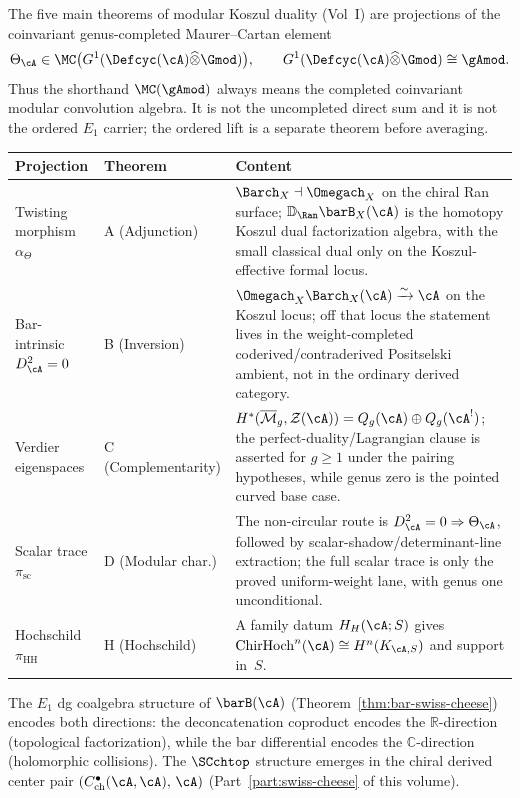 \begin{construction}
\label{constr:vol2-five-theorems-projections}
The five main theorems of modular Koszul duality (Vol~I) are
projections of the coinvariant genus-completed Maurer--Cartan
element
\[
\Theta_\cA \in
\MC\bigl(G^1(\Defcyc(\cA)\widehat{\otimes}\Gmod)\bigr),
\qquad
G^1(\Defcyc(\cA)\widehat{\otimes}\Gmod)\cong\gAmod .
\]
Thus the shorthand $\MC(\gAmod)$ always means the completed
coinvariant modular convolution algebra. It is not the uncompleted
direct sum and it is not the ordered $E_1$ carrier; the ordered lift
is a separate theorem before averaging.
\begin{center}
\begin{tabular}{@{}p{}p{}p{}@{}}
\toprule
Projection & Theorem & Content \\
\midrule
Twisting morphism $\alpha_\Theta$ & A (Adjunction) & $\Barch_X\dashv\Omegach_X$ on the chiral Ran surface; $\mathbb D_{\Ran}\barB_X(\cA)$ is the homotopy Koszul dual factorization algebra, with the small classical dual only on the Koszul-effective formal locus. \\
Bar-intrinsic $D_\cA^2 = 0$ & B (Inversion) & $\Omegach_X\Barch_X(\cA)\xrightarrow{\sim}\cA$ on the Koszul locus; off that locus the statement lives in the weight-completed coderived/contraderived Positselski ambient, not in the ordinary derived category. \\
Verdier eigenspaces & C (Complementarity) & $H^*(\overline{\mathcal M}_g,\mathcal Z(\cA))=Q_g(\cA)\oplus Q_g(\cA^!)$; the perfect-duality/Lagrangian clause is asserted for $g\ge1$ under the pairing hypotheses, while genus zero is the pointed curved base case. \\
Scalar trace $\pi_{\mathrm{sc}}$ & D (Modular char.) & The non-circular route is $D_\cA^2=0\Rightarrow\Theta_\cA$, followed by scalar-shadow/determinant-line extraction; the full scalar trace is only the proved uniform-weight lane, with genus one unconditional. \\
Hochschild $\pi_{\mathrm{HH}}$ & H (Hochschild) & A family datum $H_H(\cA;S)$ gives $\mathrm{ChirHoch}^n(\cA)\cong H^n(K_{\cA,S})$ and support in~$S$. \\
\bottomrule
\end{tabular}
\end{center}
The $E_1$ dg coalgebra structure of $\barB(\cA)$ (Theorem~\ref{thm:bar-swiss-cheese}) encodes both directions: the deconcatenation coproduct encodes the $\mathbb{R}$-direction (topological factorization), while the bar differential encodes the $\mathbb{C}$-direction (holomorphic collisions). The $\SCchtop$ structure emerges in the chiral derived center pair $(C^\bullet_{\mathrm{ch}}(\cA,\cA),\, \cA)$ (Part~\ref{part:swiss-cheese} of this volume).
\end{construction}

